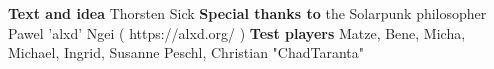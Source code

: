 \newpage
\begin{center}
\textbf{Text and idea}
\newline
Thorsten Sick
\newline
\textbf{Special thanks to}
\newline
the Solarpunk philosopher Pawel 'alxd' Ngei ( https://alxd.org/ )
\newline
\textbf{Test players}
\newline
Matze, Bene, Micha, Michael, Ingrid, Susanne Peschl, Christian "ChadTaranta"
\newline
\end{center}
\newpage
